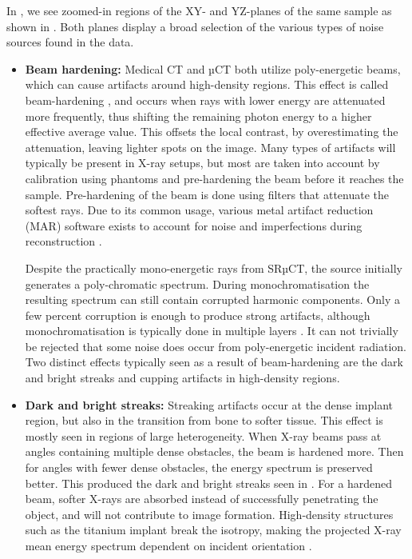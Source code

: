 In , we see zoomed-in regions of the XY- and YZ-planes of the
same sample as shown in . Both planes display a broad
selection of the various types of noise sources found in the data.
\begin{itemize}
  \item \textbf{Beam hardening:} Medical CT and µCT both utilize poly-energetic
      beams, which can cause artifacts around high-density regions. This effect
        is called beam-hardening \citep{beam-hardening}, and occurs when rays
        with lower energy are attenuated more frequently, thus shifting the
        remaining photon energy to a higher effective average value. This
        offsets the local contrast, by overestimating the attenuation, leaving
        lighter spots on the image. Many types of artifacts will typically be
        present in X-ray setups, but most are taken into account by calibration
        using phantoms and pre-hardening the beam before it reaches the sample.
        Pre-hardening of the beam is done using filters that attenuate the
        softest rays. Due to its common usage, various metal artifact reduction
        (MAR) software exists to account for noise and imperfections during
        reconstruction \citep{mar1}\citep{mar2}.

    Despite the practically mono-energetic rays from SRµCT, the source
        initially generates a poly-chromatic spectrum. During
        monochromatisation the resulting spectrum can still contain corrupted
        harmonic components. Only a few percent corruption is enough to produce
        strong artifacts, although monochromatisation is typically done in
        multiple layers \citep{srnoise}. It can not trivially be rejected that
        some noise does occur from poly-energetic incident radiation. Two
        distinct effects typically seen as a result of beam-hardening are the
        dark and bright streaks and cupping artifacts in high-density regions.

  \item \textbf{Dark and bright streaks:} Streaking artifacts occur at the dense
    implant region, but also in the transition from bone to softer tissue. This
        effect is mostly seen in regions of large heterogeneity. When X-ray
        beams pass at angles containing multiple dense obstacles, the beam is
        hardened more. Then for angles with fewer dense obstacles, the energy
        spectrum is preserved better. This produced the dark and bright streaks
        seen in .
        For a hardened beam, softer X-rays are absorbed instead of successfully
        penetrating the object, and will not contribute to image formation.
        High-density structures such as the titanium implant break the
        isotropy, making the projected X-ray mean energy spectrum dependent on
        incident orientation \citep{srnoise}.


\end{itemize}
